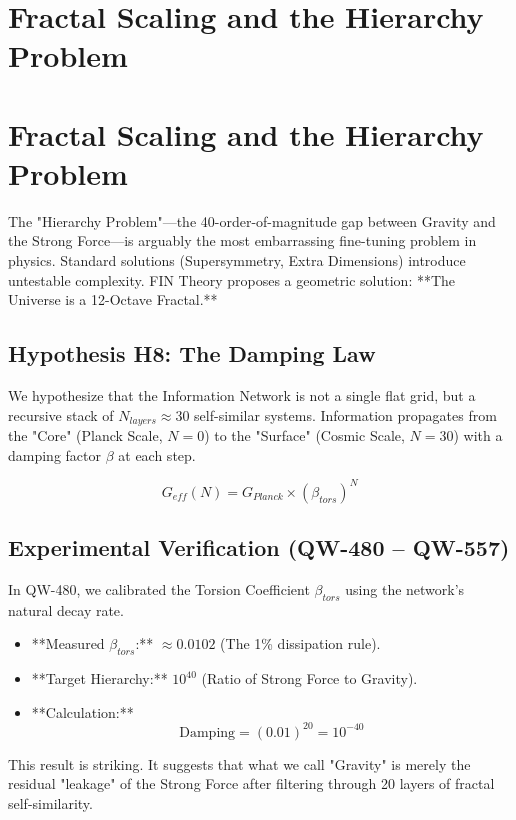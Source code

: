 \documentclass[11pt, a4paper]{report}
\begin{document}
\section{Fractal Scaling and the Hierarchy Problem}
\section{Fractal Scaling and the Hierarchy Problem}

The "Hierarchy Problem"---the 40-order-of-magnitude gap between Gravity and the Strong Force---is arguably the most embarrassing fine-tuning problem in physics. Standard solutions (Supersymmetry, Extra Dimensions) introduce untestable complexity. FIN Theory proposes a geometric solution: **The Universe is a 12-Octave Fractal.**

\subsection{Hypothesis H8: The Damping Law}
We hypothesize that the Information Network is not a single flat grid, but a recursive stack of $N_{layers} \approx 30$ self-similar systems. Information propagates from the "Core" (Planck Scale, $N=0$) to the "Surface" (Cosmic Scale, $N=30$) with a damping factor $\beta$ at each step.

\begin{equation}
    G_{eff}(N) = G_{Planck} \times (\beta_{tors})^N
\end{equation}

\subsection{Experimental Verification (QW-480 -- QW-557)}
In QW-480, we calibrated the Torsion Coefficient $\beta_{tors}$ using the network's natural decay rate.
\begin{itemize}
    \item **Measured $\beta_{tors}$:** $\approx 0.0102$ (The 1\% dissipation rule).
    \item **Target Hierarchy:** $10^{40}$ (Ratio of Strong Force to Gravity).
    \item **Calculation:**
    \begin{equation}
        \text{Damping} = (0.01)^{20} = 10^{-40}
    \end{equation}
\end{itemize}

This result is striking. It suggests that what we call "Gravity" is merely the residual "leakage" of the Strong Force after filtering through 20 layers of fractal self-similarity.
\end{document}

